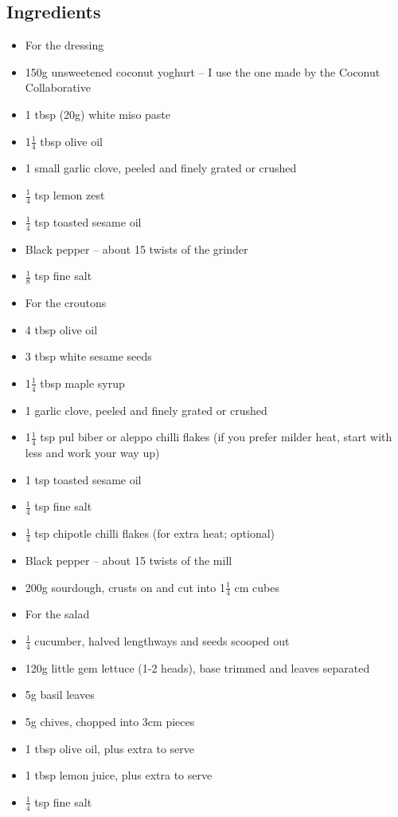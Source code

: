 \documentclass{book}
\begin{document}
\subsection*{Ingredients}
\begin{itemize}
\item For the dressing
\item 150g unsweetened coconut yoghurt – I use the one made by the Coconut Collaborative
\item 1 tbsp (20g) white miso paste
\item 1$\frac{1}{4}$ tbsp olive oil
\item 1 small garlic clove, peeled and finely grated or crushed
\item $\frac{1}{4}$ tsp lemon zest
\item $\frac{1}{4}$ tsp toasted sesame oil
\item Black pepper – about 15 twists of the grinder
\item $\frac{1}{8}$ tsp fine salt
\end{itemize}

\begin{itemize}
\item For the croutons
\item 4 tbsp olive oil
\item 3 tbsp white sesame seeds
\item 1$\frac{1}{4}$ tbsp maple syrup
\item 1 garlic clove, peeled and finely grated or crushed
\item 1$\frac{1}{4}$ tsp pul biber or aleppo chilli flakes (if you prefer milder heat, start with less and work your way up)
\item 1 tsp toasted sesame oil
\item $\frac{1}{4}$ tsp fine salt
\item $\frac{1}{4}$ tsp chipotle chilli flakes (for extra heat; optional)
\item Black pepper – about 15 twists of the mill
\item 200g sourdough, crusts on and cut into 1$\frac{1}{4}$ cm cubes
\end{itemize}

\begin{itemize}
\item For the salad
\item $\frac{1}{4}$ cucumber, halved lengthways and seeds scooped out
\item 120g little gem lettuce (1-2 heads), base trimmed and leaves separated
\item 5g basil leaves
\item 5g chives, chopped into 3cm pieces
\item 1 tbsp olive oil, plus extra to serve
\item 1 tbsp lemon juice, plus extra to serve
\item $\frac{1}{4}$ tsp fine salt
\end{itemize}
\end{document}
